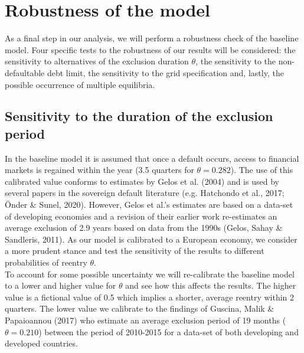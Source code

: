 \section{Robustness of the model}
As a final step in our analysis, we will perform a robustness check of the baseline model. Four specific tests to the robustness of our results will be considered: the sensitivity to alternatives of the exclusion duration $\theta$, the sensitivity to the non-defaultable debt limit, the sensitivity to the grid specification and, lastly, the possible occurrence of multiple equilibria.\\
\subsection{Sensitivity to the duration of the exclusion period}
In the baseline model it is assumed that once a default occurs, access to financial markets is regained within the year (3.5 quarters for $\theta = 0.282$). The use of this calibrated value conforms to estimates by Gelos et al. (2004) and is used by several papers in the sovereign default literature (e.g. Hatchondo et al., 2017; Önder \& Sunel,  2020). However, Gelos et al.'s estimates are based on a data-set of developing economies and a revision of their earlier work re-estimates an average exclusion of 2.9 years based on data from the 1990s (Gelos, Sahay \& Sandleris, 2011). As our model is calibrated to a European economy, we consider a more prudent stance and test the sensitivity of the results to different probabilities of reentry $\theta$.\\
\clearpage
To account for some possible uncertainty we will re-calibrate the baseline model to a lower and higher value for $\theta$ and see how this affects the results. The higher value is a fictional value of 0.5 which implies a shorter, average reentry within 2 quarters. The lower value we calibrate to the findings of Guscina, Malik \& Papaioannou (2017) who estimate an average exclusion period of 19 months ($\theta = 0.210$) between the period of 2010-2015 for a data-set of both developing and developed countries.\\

